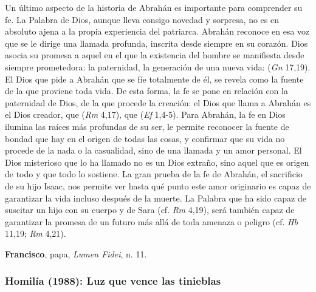 \begin{patercite}
	Un último aspecto de la historia de Abrahán es importante para comprender su fe. La Palabra de Dios, aunque lleva consigo novedad y sorpresa, no es en absoluto ajena a la propia experiencia del patriarca. Abrahán reconoce en esa voz que se le dirige una llamada profunda, inscrita desde siempre en su corazón. Dios asocia su promesa a aquel  en el que la existencia del hombre se manifiesta desde siempre prometedora: la paternidad, la generación de una nueva vida:  (\textit{Gn} 17,19). El Dios que pide a Abrahán que se fíe totalmente de él, se revela como la fuente de la que proviene toda vida. De esta forma, la fe se pone en relación con la paternidad de Dios, de la que procede la creación: el Dios que llama a Abrahán es el Dios creador, que  (\textit{Rm} 4,17), que  (\textit{Ef} 1,4-5). Para Abrahán, la fe en Dios ilumina las raíces más profundas de su ser, le permite reconocer la fuente de bondad que hay en el origen de todas las cosas, y confirmar que su vida no procede de la nada o la casualidad, sino de una llamada y un amor personal. El Dios misterioso que lo ha llamado no es un Dios extraño, sino aquel que es origen de todo y que todo lo sostiene. La gran prueba de la fe de Abrahán, el sacrificio de su hijo Isaac, nos permite ver hasta qué punto este amor originario es capaz de garantizar la vida incluso después de la muerte. La Palabra que ha sido capaz de suscitar un hijo con su cuerpo  y  de Sara (cf. \textit{Rm} 4,19), será también capaz de garantizar la promesa de un futuro más allá de toda amenaza o peligro (cf. \textit{Hb} 11,19; \textit{Rm} 4,21).
	
	\textbf{Francisco}, papa, \textit{Lumen Fidei}, n. 11.
\end{patercite}

\newpage  

\subsubsection{Homilía (1988): Luz que vence las tinieblas}


